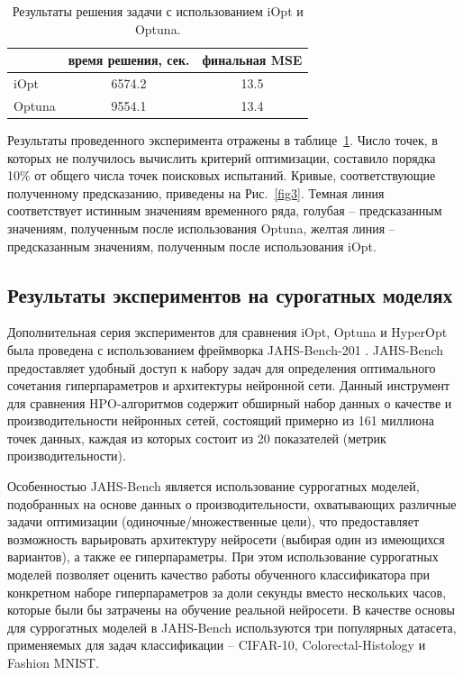 \documentclass[a4paper,12pt,russian]{article}
\begin{document}
\begin{table}[h!]
\centering
\caption{Результаты решения задачи с использованием iOpt и Optuna.}\label{tab1}
\begin{tabular}{|l|c|c|}
\hline
& время решения, сек. & финальная MSE \\
\hline
iOpt & 6574.2 & 13.5 \\
\hline
Optuna &  9554.1 & 13.4 \\
\hline
\end{tabular}
\end{table}

Результаты проведенного эксперимента отражены в таблице~\ref{tab1}. Число точек, в которых не получилось вычислить критерий оптимизации, составило порядка 10\% от общего числа точек поисковых испытаний. Кривые, соответствующие полученному предсказанию, приведены на Рис.~\ref{fig3}. Темная линия соответствует истинным значениям временного ряда, голубая -- предсказанным значениям, полученным после использования Optuna, желтая линия -- предсказанным значениям, полученным после использования iOpt.

\subsection{Результаты экспериментов на сурогатных моделях}

Дополнительная серия экспериментов для сравнения iOpt, Optuna и HyperOpt была проведена с использованием фреймворка JAHS-Bench-201%
. JAHS-Bench предоставляет удобный доступ к набору задач для определения оптимального сочетания гиперпараметров и архитектуры нейронной сети. Данный инструмент для сравнения HPO-алгоритмов содержит обширный набор данных о качестве и производительности нейронных сетей, состоящий примерно из 161 миллиона точек данных, каждая из которых состоит из 20 показателей (метрик производительности).

Особенностью JAHS-Bench является использование суррогатных моделей, подобранных на основе данных о производительности, охватывающих различные задачи оптимизации (одиночные/множественные цели), что предоставляет возможность варьировать архитектуру нейросети (выбирая один из имеющихся вариантов), а также ее гиперпараметры. При этом использование суррогатных моделей позволяет оценить качество работы обученного классификатора при конкретном наборе гиперпараметров за доли секунды вместо нескольких часов, которые были бы затрачены на обучение реальной нейросети. В качестве основы для суррогатных моделей в JAHS-Bench используются три популярных датасета, применяемых для задач классификации -- CIFAR-10, Colorectal-Histology и Fashion MNIST.
\end{document}
